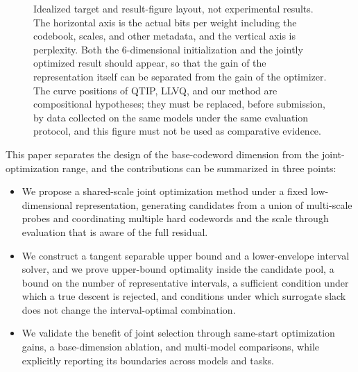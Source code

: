 \begin{figure}[t]
\centering
{}
\caption{
Idealized target and result-figure layout, not experimental results.
The horizontal axis is the actual bits per weight including the codebook, scales, and other metadata, and the vertical axis is perplexity.
Both the 6-dimensional initialization and the jointly optimized result should appear, so that the gain of the representation itself can be separated from the gain of the optimizer.
The curve positions of QTIP, LLVQ, and our method are compositional hypotheses; they must be replaced, before submission, by data collected on the same models under the same evaluation protocol, and this figure must not be used as comparative evidence.
}
\label{fig:target}
\end{figure}

This paper separates the design of the base-codeword dimension from the joint-optimization range, and the contributions can be summarized in three points:
\begin{itemize}
\item
We propose a shared-scale joint optimization method under a fixed low-dimensional representation, generating candidates from a union of multi-scale probes and coordinating multiple hard codewords and the scale through evaluation that is aware of the full residual.
\item
We construct a tangent separable upper bound and a lower-envelope interval solver, and we prove upper-bound optimality inside the candidate pool, a bound on the number of representative intervals, a sufficient condition under which a true descent is rejected, and conditions under which surrogate slack does not change the interval-optimal combination.
\item
We validate the benefit of joint selection through same-start optimization gains, a base-dimension ablation, and multi-model comparisons, while explicitly reporting its boundaries across models and tasks.
\end{itemize}
